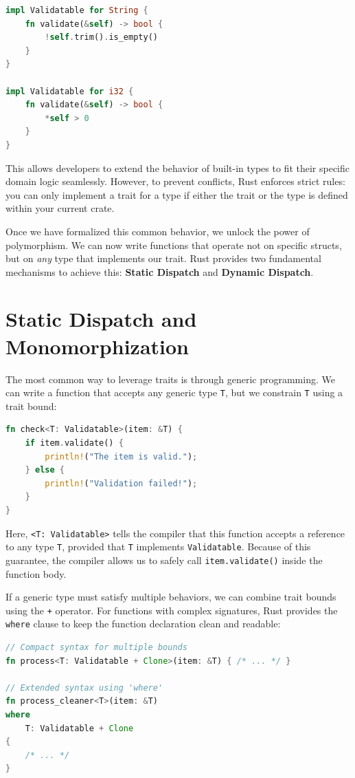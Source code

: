 \begin{lstlisting}[language=Rust]
impl Validatable for String {
    fn validate(&self) -> bool {
        !self.trim().is_empty()
    }
}

impl Validatable for i32 {
    fn validate(&self) -> bool {
        *self > 0
    }
}
\end{lstlisting}

This allows developers to extend the behavior of built-in types to fit their specific domain logic seamlessly. However, to prevent conflicts, Rust enforces strict rules: you can only implement a trait for a type if either the trait or the type is defined within your current crate.

Once we have formalized this common behavior, we unlock the power of polymorphism. We can now write functions that operate not on specific structs, but on \textit{any} type that implements our trait. Rust provides two fundamental mechanisms to achieve this: \textbf{Static Dispatch} and \textbf{Dynamic Dispatch}.

\section*{Static Dispatch and Monomorphization}

The most common way to leverage traits is through generic programming. We can write a function that accepts any generic type \texttt{T}, but we constrain \texttt{T} using a trait bound:

\begin{lstlisting}[language=Rust]
fn check<T: Validatable>(item: &T) {
    if item.validate() {
        println!("The item is valid.");
    } else {
        println!("Validation failed!");
    }
}
\end{lstlisting}

Here, \texttt{<T: Validatable>} tells the compiler that this function accepts a reference to any type \texttt{T}, provided that \texttt{T} implements \texttt{Validatable}. Because of this guarantee, the compiler allows us to safely call \texttt{item.validate()} inside the function body. 

If a generic type must satisfy multiple behaviors, we can combine trait bounds using the \texttt{+} operator. For functions with complex signatures, Rust provides the \texttt{where} clause to keep the function declaration clean and readable:

\begin{lstlisting}[language=Rust]
// Compact syntax for multiple bounds
fn process<T: Validatable + Clone>(item: &T) { /* ... */ }

// Extended syntax using 'where'
fn process_cleaner<T>(item: &T) 
where 
    T: Validatable + Clone 
{ 
    /* ... */ 
}
\end{lstlisting}

